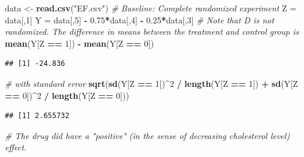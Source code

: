 \documentclass[]{article}
\newenvironment{Shaded}{\begin{snugshade}}{\end{snugshade}}
\newcommand{\KeywordTok}[1]{\textcolor[rgb]{0.13,0.29,0.53}{\textbf{#1}}}
\newcommand{\DecValTok}[1]{\textcolor[rgb]{0.00,0.00,0.81}{#1}}
\newcommand{\FloatTok}[1]{\textcolor[rgb]{0.00,0.00,0.81}{#1}}
\newcommand{\StringTok}[1]{\textcolor[rgb]{0.31,0.60,0.02}{#1}}
\newcommand{\CommentTok}[1]{\textcolor[rgb]{0.56,0.35,0.01}{\textit{#1}}}
\newcommand{\OperatorTok}[1]{\textcolor[rgb]{0.81,0.36,0.00}{\textbf{#1}}}
\newcommand{\NormalTok}[1]{#1}
\begin{document}
\begin{Shaded}
\begin{Highlighting}[]
\NormalTok{data <-}\StringTok{ }\KeywordTok{read.csv}\NormalTok{(}\StringTok{"EF.csv"}\NormalTok{)}
\CommentTok{# Baseline: Complete randomized experiment}
\NormalTok{Z =}\StringTok{ }\NormalTok{data[,}\DecValTok{1}\NormalTok{]}
\NormalTok{Y =}\StringTok{ }\NormalTok{data[,}\DecValTok{5}\NormalTok{] }\OperatorTok{-}\StringTok{ }\FloatTok{0.75}\OperatorTok{*}\NormalTok{data[,}\DecValTok{4}\NormalTok{] }\OperatorTok{-}\StringTok{ }\FloatTok{0.25}\OperatorTok{*}\NormalTok{data[,}\DecValTok{3}\NormalTok{]}
\CommentTok{# Note that D is not randomized. The difference in means between the treatment and control group is}
\KeywordTok{mean}\NormalTok{(Y[Z }\OperatorTok{==}\StringTok{ }\DecValTok{1}\NormalTok{]) }\OperatorTok{-}\StringTok{ }\KeywordTok{mean}\NormalTok{(Y[Z }\OperatorTok{==}\StringTok{ }\DecValTok{0}\NormalTok{])}
\end{Highlighting}
\end{Shaded}

\begin{verbatim}
## [1] -24.836
\end{verbatim}

\begin{Shaded}
\begin{Highlighting}[]
\CommentTok{# with standard error}
\KeywordTok{sqrt}\NormalTok{(}\KeywordTok{sd}\NormalTok{(Y[Z }\OperatorTok{==}\StringTok{ }\DecValTok{1}\NormalTok{])}\OperatorTok{^}\DecValTok{2} \OperatorTok{/}\StringTok{ }\KeywordTok{length}\NormalTok{(Y[Z }\OperatorTok{==}\StringTok{ }\DecValTok{1}\NormalTok{]) }\OperatorTok{+}\StringTok{ }\KeywordTok{sd}\NormalTok{(Y[Z }\OperatorTok{==}\StringTok{ }\DecValTok{0}\NormalTok{])}\OperatorTok{^}\DecValTok{2} \OperatorTok{/}\StringTok{ }\KeywordTok{length}\NormalTok{(Y[Z }\OperatorTok{==}\StringTok{ }\DecValTok{0}\NormalTok{]))}
\end{Highlighting}
\end{Shaded}

\begin{verbatim}
## [1] 2.655732
\end{verbatim}

\begin{Shaded}
\begin{Highlighting}[]
\CommentTok{# The drug did have a "positive" (in the sense of decreasing cholesterol level) effect.}
\end{Highlighting}
\end{Shaded}
\end{document}
